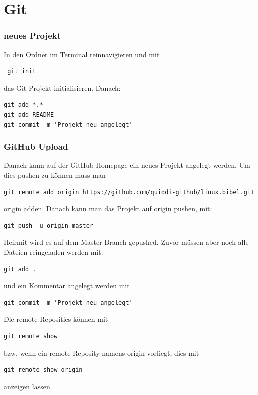 \documentclass[11pt,fleqn]{book} %
\numberwithin{equation}{section} %
\numberwithin{figure}{section} %
\numberwithin{table}{section} %
\begin{document}





 \tableofcontents %
\newpage


\chapter{Git}
\subsection{neues Projekt}
In den Ordner im Terminal reinnavigieren und mit 
\begin{lstlisting}
 git init
\end{lstlisting}
das Git-Projekt initialisieren. Danach:
\begin{lstlisting}
git add *.*
git add README
git commit -m 'Projekt neu angelegt'
\end{lstlisting}
\subsection{GitHub Upload}
Danach kann auf der GitHub Homepage ein neues Projekt angelegt werden. Um dies pushen zu können muss man
\begin{lstlisting}
git remote add origin https://github.com/quiddi-github/linux.bibel.git
\end{lstlisting}
origin adden. Danach kann man das Projekt auf origin pushen, mit:
\begin{lstlisting}
git push -u origin master
\end{lstlisting}
Heirmit wird es auf dem Master-Branch gepushed.
Zuvor müssen aber noch alle Dateien reingeladen werden mit:
\begin{lstlisting}
git add .
\end{lstlisting}
und ein Kommentar angelegt werden mit
\begin{lstlisting}
git commit -m 'Projekt neu angelegt'
\end{lstlisting}
Die remote Reposities können mit
\begin{lstlisting}
git remote show
\end{lstlisting}
bzw. wenn ein remote Reposity namens origin vorliegt, dies mit
\begin{lstlisting}
git remote show origin
\end{lstlisting}
anzeigen lassen.
\end{document}
